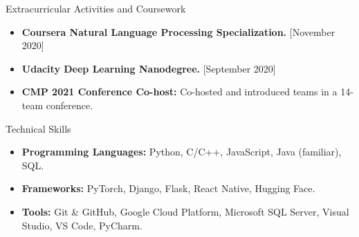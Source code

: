 \documentclass[]{mcdowellcv}
\begin{document}
	\begin{cvsection}{Extracurricular Activities and Coursework}
		\begin{cvsubsection}{}{}{}
			\begin{itemize}
				\item \textbf{Coursera Natural Language Processing Specialization.} [November 2020]
				\item \textbf{Udacity Deep Learning Nanodegree.} [September 2020]
				\item \textbf{CMP 2021 Conference Co-host:} Co-hosted and introduced teams in a 14-team conference.
			\end{itemize}
		\end{cvsubsection}
	\end{cvsection}
	
	\begin{cvsection}{Technical Skills}
		\begin{cvsubsection}{}{}{}
			\begin{itemize}
				\item \textbf{Programming Languages:} Python, C/C++, JavaScript, Java (familiar), SQL.
				\item \textbf{Frameworks:} PyTorch, Django, Flask, React Native, Hugging Face.
				\item \textbf{Tools:} Git \& GitHub, Google Cloud Platform, Microsoft SQL Server, Visual Studio, VS Code, PyCharm.
			\end{itemize}
		\end{cvsubsection}
	\end{cvsection}
	
\end{document}
